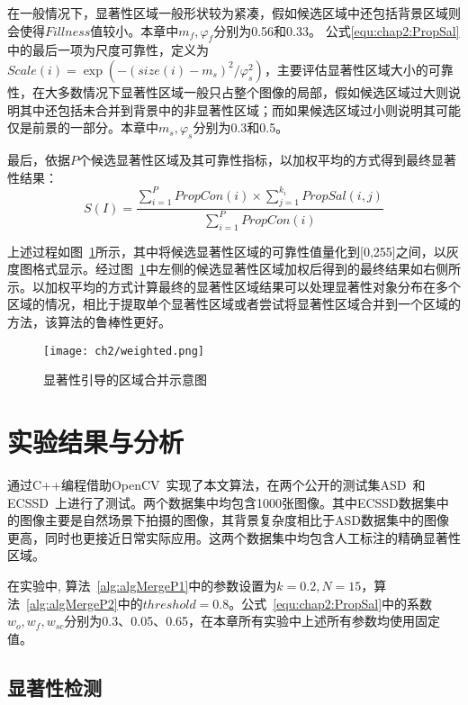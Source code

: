 在一般情况下，显著性区域一般形状较为紧凑，假如候选区域中还包括背景区域则会使得$Fillness$值较小。本章中$m_f,\varphi_f$分别为0.56和0.33。 公式\ref{equ:chap2:PropSal}中的最后一项为尺度可靠性，定义为$Scale(i)= \exp(-(size(i)- m_s)^2/\varphi_s^2)$，主要评估显著性区域大小的可靠性，在大多数情况下显著性区域一般只占整个图像的局部，假如候选区域过大则说明其中还包括未合并到背景中的非显著性区域；而如果候选区域过小则说明其可能仅是前景的一部分。本章中$m_s,\varphi_s$分别为0.3和0.5。\par

最后，依据$P$个候选显著性区域及其可靠性指标，以加权平均的方式得到最终显著性结果：
$$ S(I) = \frac{\sum_{i=1}^{P}PropCon(i) \times \sum_{j=1}^{k_i}PropSal(i,j)}{\sum_{i=1}^{P}PropCon(i)}$$

上述过程如图~\ref{fig:weighted}所示，其中将候选显著性区域的可靠性值量化到[0,255]之间，以灰度图格式显示。经过图~\ref{fig:weighted}中左侧的候选显著性区域加权后得到的最终结果如右侧所示。以加权平均的方式计算最终的显著性区域结果可以处理显著性对象分布在多个区域的情况，相比于提取单个显著性区域或者尝试将显著性区域合并到一个区域的方法，该算法的鲁棒性更好。
\begin{figure}[htb]
  \centering%
      {\texttt{[image: ch2/weighted.png]}}\\

  \caption{显著性引导的区域合并示意图}
  \label{fig:weighted}
\end{figure}

\section{实验结果与分析}
\label{sec:results}


通过C++编程借助OpenCV~\cite{opencv_library}实现了本文算法，在两个公开的测试集ASD~\cite{Achanta08}和ECSSD~\cite{ECSSD}上进行了测试。两个数据集中均包含1000张图像。其中ECSSD数据集中的图像主要是自然场景下拍摄的图像，其背景复杂度相比于ASD数据集中的图像更高，同时也更接近日常实际应用。这两个数据集中均包含人工标注的精确显著性区域。\par
在实验中, 算法~\ref{alg:algMergeP1}中的参数设置为$k=0.2,N=15$，算法~\ref{alg:algMergeP2}中的$threshold=0.8$。公式~\ref{equ:chap2:PropSal}中的系数$w_o,w_f,w_{sc}$分别为0.3、0.05、0.65，在本章所有实验中上述所有参数均使用固定值。

\subsection{显著性检测}
\label{sec:sub:saliencyRst}

